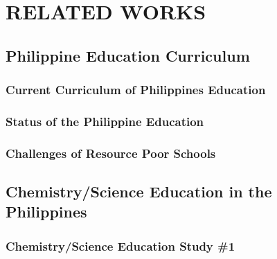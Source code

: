 \chapter{RELATED WORKS}

\section{Philippine Education Curriculum}

\subsection{Current Curriculum of Philippines Education}


\subsection{Status of the Philippine Education}


\subsection{Challenges of Resource Poor Schools}



\section{Chemistry/Science Education in the Philippines}

\subsection{Chemistry/Science Education Study \#1}

